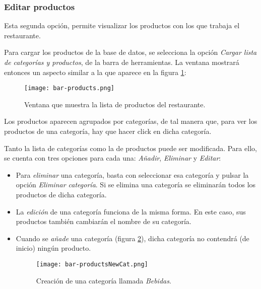 \subsubsection{Editar productos}
Esta segunda opción, permite visualizar los productos con los que trabaja el 
restaurante.

Para cargar los productos de la base de datos, se selecciona la opción
\emph{Cargar lista de categorías y productos}, de la barra de herramientas.
La ventana mostrará entonces un aspecto similar a la que aparece en la figura 
\ref{fig:bar-products}:

  \begin{figure}[H]
    \begin{center}
      \texttt{[image: bar-products.png]}
      \caption{Ventana que muestra la lista de productos del restaurante.}
      \label{fig:bar-products}
    \end{center}
  \end{figure}

Los productos aparecen agrupados por categorías, de tal manera que, para ver
los productos de una categoría, hay que hacer click en dicha categoría.

Tanto la lista de categorías como la de productos puede ser modificada. Para
ello, se cuenta con tres opciones para cada una: \emph{Añadir}, \emph{Eliminar}
y \emph{Editar}:

\begin{itemize}
\item Para \emph{eliminar} una categoría, basta con seleccionar esa categoría y 
pulsar la opción \emph{Eliminar categoría}. Si se elimina una categoría se 
eliminarán todos los productos de dicha categoría.
\item La \emph{edición} de una categoría funciona de la misma forma. En este
caso, sus productos también cambiarán el nombre de su categoría.
\item Cuando se \emph{añade} una categoría (figura
\ref{fig:bar-productsNewCat}), dicha categoría no contendrá (de inicio) ningún
producto.

  \begin{figure}[H]
    \begin{center}
      \texttt{[image: bar-productsNewCat.png]}
      \caption{Creación de una categoría llamada \emph{Bebidas}.}
      \label{fig:bar-productsNewCat}
    \end{center}
  \end{figure}

\end{itemize}

